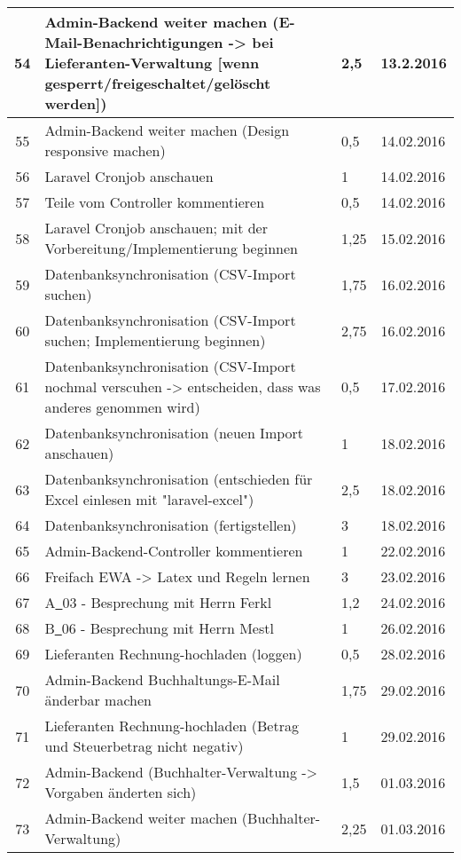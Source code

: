 \begin{longtable}[h]{| c | p{11.6cm} | l | l |}
54 & Admin-Backend weiter machen (E-Mail-Benachrichtigungen -> bei Lieferanten-Verwaltung [wenn gesperrt/freigeschaltet/gelöscht werden]) & 2,5 & 13.2.2016 \\ \hline
55 & Admin-Backend weiter machen (Design responsive machen) & 0,5 & 14.02.2016 \\ \hline
56 & Laravel Cronjob anschauen & 1 & 14.02.2016 \\ \hline
57 & Teile vom Controller kommentieren & 0,5 & 14.02.2016 \\ \hline
58 & Laravel Cronjob anschauen; mit der Vorbereitung/Implementierung beginnen & 1,25 & 15.02.2016 \\ \hline
59 & Datenbanksynchronisation (CSV-Import suchen) & 1,75 & 16.02.2016 \\ \hline
60 & Datenbanksynchronisation (CSV-Import suchen; Implementierung beginnen) & 2,75 & 16.02.2016 \\ \hline
61 & Datenbanksynchronisation (CSV-Import nochmal verscuhen -> entscheiden, dass was anderes genommen wird) & 0,5 & 17.02.2016 \\ \hline
62 & Datenbanksynchronisation (neuen Import anschauen) & 1 & 18.02.2016 \\ \hline
63 & Datenbanksynchronisation (entschieden für Excel einlesen mit "laravel-excel") & 2,5 & 18.02.2016 \\ \hline
64 & Datenbanksynchronisation (fertigstellen) & 3 & 18.02.2016 \\ \hline
65 & Admin-Backend-Controller kommentieren & 1 & 22.02.2016 \\ \hline
66 & Freifach EWA -> Latex und Regeln lernen & 3 & 23.02.2016 \\ \hline
67 & A\underline{\ }03 - Besprechung mit Herrn Ferkl & 1,2 & 24.02.2016 \\ \hline
68 & B\underline{\ }06 - Besprechung mit Herrn Mestl & 1 & 26.02.2016 \\ \hline
69 & Lieferanten Rechnung-hochladen (loggen) & 0,5 & 28.02.2016 \\ \hline
70 & Admin-Backend Buchhaltungs-E-Mail änderbar machen & 1,75 & 29.02.2016 \\ \hline
71 & Lieferanten Rechnung-hochladen (Betrag und Steuerbetrag nicht negativ) & 1 & 29.02.2016 \\ \hline
72 & Admin-Backend (Buchhalter-Verwaltung -> Vorgaben änderten sich) & 1,5 & 01.03.2016 \\ \hline
73 & Admin-Backend weiter machen (Buchhalter-Verwaltung) & 2,25 & 01.03.2016 \\ \hline

\end{longtable}
